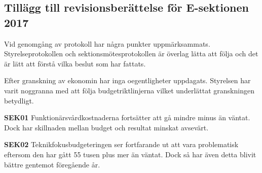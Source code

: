 \documentclass[../_main/handlingar.tex]{subfiles}
\begin{document}
\subsection{Tillägg till revisionsberättelse för E-sektionen 2017}

Vid genomgång av protokoll har några punkter uppmärksammats. Styrelseprotokollen och sektionsmötesprotokollen är överlag
lätta att följa och det är lätt att förstå vilka beslut som har fattats. 

Efter granskning av ekonomin har inga oegentligheter uppdagats. Styrelsen har varit noggranna med att följa budgetriktlinjerna vilket underlättat granskningen betydligt. 

\textbf{SEK01} Funktionärsvårdkostnaderna fortsätter att gå mindre minus än väntat. Dock har skillnaden mellan budget och resultat minskat avsevärt.

\textbf{SEK02} Teknikfokusbudgeteringen ser fortfarande ut att vara problematisk eftersom den har gått 55 tusen plus mer än väntat. Dock så har även detta blivit bättre gentemot föregående år. 
\end{document}
